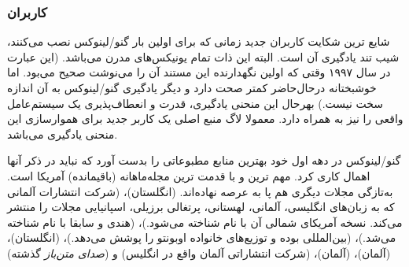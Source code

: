 \subsubsection{کاربران}

شایع ترین شکایت کاربران جدید زمانی که برای اولین بار
گنو/لینوکس نصب می‌کنند، شیب تند یادگیری آن است.
البته این ذات تمام یونیکس‌های مدرن می‌باشد.
(این عبارت در سال ۱۹۹۷ وقتی که اولین نگهدارنده این
مستند آن را می‌نوشت صحیح می‌بود. اما خوشبختانه درحال‌حاضر
کمتر صحت دارد و دیگر یادگیری گنو/لینوکس به آن اندازه سخت نیست.)
بهرحال این منحنی یادگیری، قدرت و انعطاف‌پذیری
یک سیستم‌عامل واقعی را نیز به همراه دارد.
معمولا لاگ منبع اصلی یک کاربر جدید برای هموارسازی
این منحنی یادگیری می‌باشد.

گنو/لینوکس در دهه اول خود بهترین منابع مطبوعاتی را بدست آورد
که نباید در ذکر آنها اهمال کاری کرد.
مهم ترین و با قدمت ترین مجله‌ماهانه (باقیمانده) آمریکا
است. به‌تازگی مجلات دیگری هم پا به عرصه نهاده‌اند.
‌(انگلستان)،
(شرکت انتشارات آلمانی که به زبان‌های انگلیسی،
آلمانی، لهستانی، پرتغالی برزیلی، اسپانیایی
مجلات را منتشر می‌کند. نسخه آمریکای شمالی آن
با نام
شناخته می‌شود.)،
(هندی و سابقا با نام
شناخته می‌شد.)،
(بین‌المللی بوده و توزیع‌های خانواده اوبونتو را پوشش می‌دهد.)،
(انگلستان)،
(آلمان)،
(آلمان)،
(شرکت انتشاراتی آلمان واقع در انگلیس)
و
({\itshape صدای متن‌باز} گذشته)

